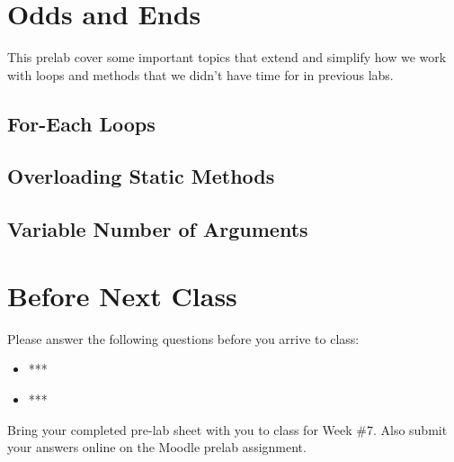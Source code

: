
\section{Odds and Ends}

This prelab cover some important topics that extend and simplify how we work with loops and methods that we didn't have time for in previous labs. 

\subsection{For-Each Loops}

\subsection{Overloading Static Methods}

\subsection{Variable Number of Arguments}


\section{Before Next Class}

Please answer the following questions before you arrive to class:

\begin{exer}

\begin{itemize}

\item ***

  \evalline
  
\item ***

  \evalline
  
\end{itemize}

\end{exer}

Bring your completed pre-lab sheet with you to class for Week \#7. Also submit your answers online on the Moodle prelab assignment.  

